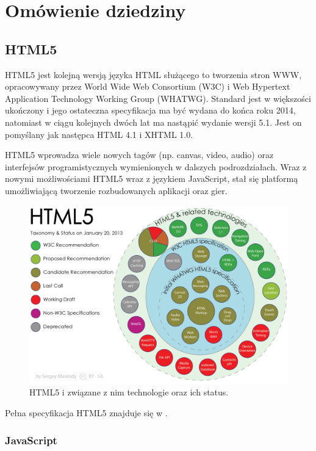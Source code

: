 \chapter{Omówienie dziedziny}
\label{cha:omowienieDziedziny}

\section{HTML5}
\label{sec:html5}
HTML5 jest kolejną wersją języka HTML służącego to tworzenia stron WWW,
opracowywany przez World Wide Web Consortium (W3C) i Web Hypertext Application
Technology Working Group (WHATWG). Standard jest w większości ukończony i jego ostateczna
specyfikacja ma być wydana do końca roku 2014, natomiast w ciągu kolejnych dwóch lat
ma nastąpić wydanie wersji 5.1. Jest on pomyślany jak następca HTML 4.1 i XHTML 1.0.

HTML5 wprowadza wiele nowych tagów (np. canvas, video, audio) oraz interfejsów programistycznych
wymienionych w dalszych podrozdziałach. 
Wraz z nowymi możliwościami HTML5 wraz z językiem JavaScript, stał się platformą
umożliwiającą tworzenie rozbudowanych aplikacji oraz gier.

\begin{figure}[h]
  \centering
  \includegraphics[scale=0.25]{zasoby/rozdzial2/HTML5}  
  \caption{HTML5 i związane z nim technologie oraz ich status.}
  \label{fig:HTML5}
\end{figure}

Pełna specyfikacja HTML5 znajduje się w \cite{html5-spec}.

\subsection{JavaScript}
\label{ssec:javascript}

